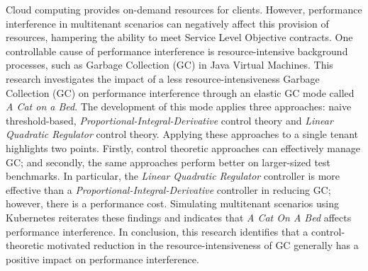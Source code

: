 Cloud computing provides on-demand resources for clients. However, 
performance interference in multitenant scenarios can negatively
affect this provision of resources, hampering the ability to meet
Service Level Objective contracts. One controllable cause of performance
interference is resource-intensive background processes, such as Garbage
Collection (GC) in Java Virtual Machines. This research investigates the
impact of a less resource-intensiveness Garbage Collection (GC) on
performance interference through an elastic GC mode
called \emph{A Cat on a Bed}. The development of this mode applies three
approaches: naive threshold-based, \emph{Proportional-Integral-Derivative}
control theory and \emph{Linear Quadratic Regulator} control theory. Applying
these approaches to a single tenant highlights two points. Firstly,
control theoretic approaches can effectively manage GC; and secondly,
the same approaches perform better on larger-sized test benchmarks. In
particular, the \emph{Linear Quadratic Regulator} controller is more effective than
a \emph{Proportional-Integral-Derivative} controller in reducing GC; however,
there is a performance cost. Simulating multitenant scenarios using Kubernetes reiterates these findings and indicates that \emph{A Cat On A Bed} affects performance interference. In conclusion, this research identifies
that a control-theoretic motivated reduction in the resource-intensiveness of GC
generally has a positive impact on performance interference.
